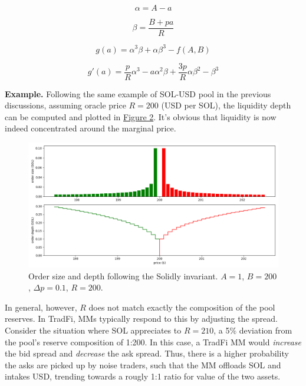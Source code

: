 \documentclass{article}
\begin{document}
\begin{equation}
  \alpha = A - a
\end{equation}

\begin{equation}
  \beta = \frac{B + p a}{R}
\end{equation}

\begin{equation}
  g(a) = \alpha^3 \beta + \alpha \beta^3 - f(A, B)
\end{equation}

\begin{equation}
  g'(a) = \frac{p}{R} \alpha^3 - a \alpha^2 \beta + \frac{3p}{R} \alpha \beta^2 - \beta^3
\end{equation}

\textbf{Example.} Following the same example of SOL-USD pool in the previous discussions, assuming oracle price $R = 200$ (USD per SOL), the liquidity depth can be computed and plotted in \hyperref[fig:2]{Figure 2}. It's obvious that liquidity is now indeed concentrated around the marginal price.

\begin{figure}
  \includegraphics[width=\textwidth]{2-solidly.png}
  \caption{Order size and depth following the Solidly invariant. $A = 1$, $B = 200$, $\Delta p = 0.1$, $R = 200$.}
  \label{fig:2}
\end{figure}

In general, however, $R$ does not match exactly the composition of the pool reserves. In TradFi, MMs typically respond to this by adjusting the spread.\supercite{avellanedastoikov} Consider the situation where SOL appreciates to $R = 210$, a 5\% deviation from the pool's reserve composition of 1:200. In this case, a TradFi MM would \textit{increase} the bid spread and \textit{decrease} the ask spread. Thus, there is a higher probability the asks are picked up by noise traders, such that the MM offloads SOL and intakes USD, trending towards a rougly 1:1 ratio for value of the two assets.
\end{document}
